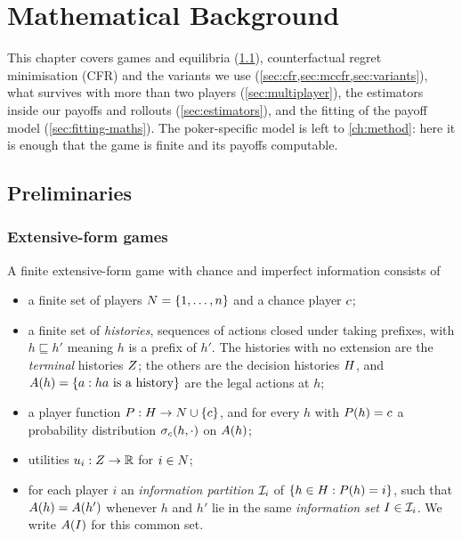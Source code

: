 \chapter{Mathematical Background}\label{ch:maths}

This chapter covers games and equilibria (\cref{sec:prelim}), counterfactual regret minimisation (CFR) and the
variants we use (\cref{sec:cfr,sec:mccfr,sec:variants}), what survives with more than two players
(\cref{sec:multiplayer}), the estimators inside our payoffs and rollouts (\cref{sec:estimators}), and the fitting of
the payoff model (\cref{sec:fitting-maths}). The poker-specific model is left to \cref{ch:method}: here it is enough
that the game is finite and its payoffs computable.

\section{Preliminaries}\label{sec:prelim}

\subsection{Extensive-form games}\label{sec:efg}

\begin{definition}\label{def:efg}
A finite extensive-form game with chance and imperfect information consists of
\begin{itemize}
\item a finite set of players $N = \{1,\dots,n\}$ and a chance player $c$;
\item a finite set of \emph{histories}, sequences of actions closed under taking prefixes, with $h \sqsubseteq h'$
  meaning $h$ is a prefix of $h'$. The histories with no extension are the \emph{terminal} histories $Z$; the
  others are the decision histories $H$, and $A(h) = \{a : ha \text{ is a history}\}$ are the legal actions at $h$;
\item a player function $P : H \to N \cup \{c\}$, and for every $h$ with $P(h) = c$ a
  probability distribution $\sigma_c(h,\cdot)$ on $A(h)$;
\item utilities $u_i : Z \to \mathbb{R}$ for $i \in N$;
\item for each player $i$ an \emph{information partition} $\mathcal{I}_i$ of $\{h \in H : P(h) = i\}$, such that
  $A(h) = A(h')$ whenever $h$ and $h'$ lie in the same \emph{information set} $I \in \mathcal{I}_i$. We write
  $A(I)$ for this common set.
\end{itemize}
\end{definition}

